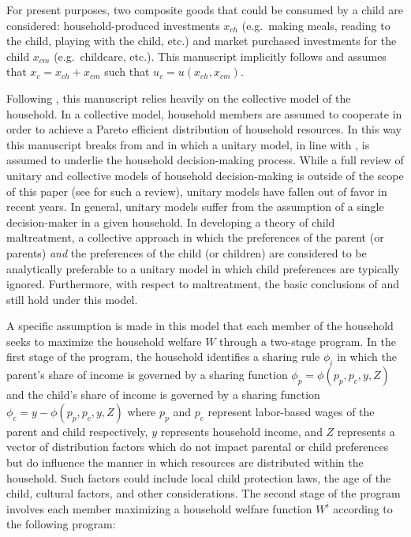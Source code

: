 For present purposes, two composite goods that could be consumed by a child are considered: household-produced investments $x_{ch}$ (e.g.~making meals, reading to the child, playing with the child, etc.) and market purchased investments for the child $x_{cm}$ (e.g.~childcare, etc.). This manuscript implicitly follows \citet{Brandon2001} and assumes that $x_c = x_{ch} + x_{cm}$ such that $u_c=u(x_{ch},x_{cm})$.

Following \citet{Chiappori1988}, this manuscript relies heavily on the collective model of the household. In a collective model, household members are assumed to cooperate in order to achieve a Pareto efficient distribution of household resources. In this way this manuscript breaks from \citet{Brandon1999} and \citet{Brandon2001} in which a unitary model, in line with \citet{Becker1981}, is assumed to underlie
the household decision-making process. While a full review of unitary and collective models of household decision-making is outside of the scope of this paper (see \citet{Chiappori2011} for such a review), unitary models have fallen out of favor in recent years. In general, unitary models suffer from the assumption of a single decision-maker in a given household. In developing a theory of child maltreatment, a
collective approach in which the preferences of the parent (or parents) \emph{and} the preferences of the child (or children) are considered to be analytically preferable to a unitary model in which child preferences are typically ignored. Furthermore, with respect to maltreatment, the basic conclusions of \citet{Brandon1999} and \citet{Brandon2001} still hold under this model.

A specific assumption is made in this model that each member of the
household seeks to maximize the household welfare $W$ through a
two-stage program. In the first stage of the program, the household
identifies a sharing rule $\phi_i$ in which the parent's share of income
is governed by a sharing function $\phi_p=\phi(p_p, p_c, y, Z)$ and the
child's share of income is governed by a sharing function
$\phi_c=y-\phi(p_p, p_c, y, Z)$ where $p_p$ and $p_c$ represent
labor-based wages of the parent and child respectively, $y$ represents
household income, and $Z$ represents a vector of distribution factors
which do not impact parental or child preferences but do influence the
manner in which resources are distributed within the household. Such
factors could include local child protection laws, the age of the child,
cultural factors, and other considerations. The second stage of the
program involves each member maximizing a household welfare function
$W^i$ according to the following program:


